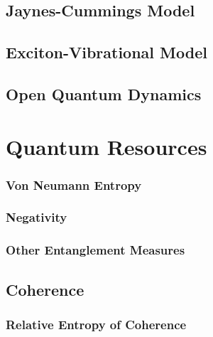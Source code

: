 \documentclass[12pt]{article}
\begin{document}
\subsection{Jaynes-Cummings Model}
\subsection{Exciton-Vibrational Model}
\subsection{Open Quantum Dynamics}












































\newpage
\section{Quantum Resources}
\subsubsection{Von Neumann Entropy}
\subsubsection{Negativity}
\subsubsection{Other Entanglement Measures}
\subsection{Coherence}
\subsubsection{Relative Entropy of Coherence}
\end{document}
